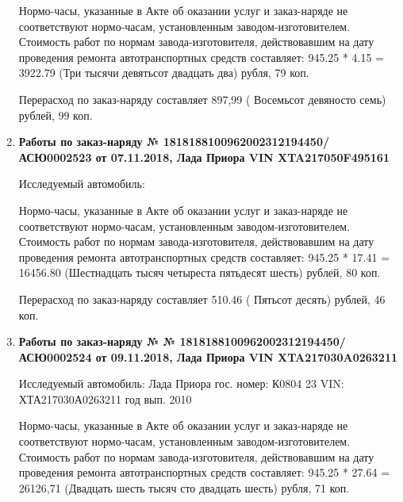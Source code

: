 \begin{enumerate}
Нормо-часы, указанные в Акте об оказании услуг и заказ-наряде не соответствуют нормо-часам,  установленным заводом-изготовителем.\\
Стоимость работ по нормам завода-изготовителя, действовавшим на дату проведения ремонта автотранспортных средств составляет: 945.25 * 4.15 = 3922.79 (Три тысячи девятьсот двадцать два) рубля, 79 коп.

Перерасход по заказ-наряду составляет 897,99 ( Восемьсот девяносто семь) рублей, 99 коп.  
\vspace{3mm}






\item \par\textbf{{Работы по заказ-наряду № 1818188100962002312194450/\-АСЮ0002523 от 07.11.2018, Лада Приора  VIN  XTA217050F495161
}}


Исследуемый автомобиль:  




Нормо-часы, указанные в Акте об оказании услуг и заказ-наряде не соответствуют нормо-часам,  установленным заводом-изготовителем.\\
Стоимость работ по нормам завода-изготовителя, действовавшим на дату проведения ремонта автотранспортных средств составляет: 945.25 * 17.41 = 16456.80 (Шестнадцать тысяч четыреста пятьдесят шесть) рублей, 80 коп.

Перерасход по заказ-наряду составляет 510.46 ( Пятьсот десять) рублей, 46 коп.  
\vspace{3mm}






\item \par\textbf{{Работы по заказ-наряду № № 1818188100962002312194450/\-АСЮ0002524 от 09.11.2018, Лада Приора VIN  XTA217030A0263211
}}


Исследуемый автомобиль:  Лада Приора гос. номер: К0804 23 VIN: ХТА217030А0263211 год вып. 2010





Нормо-часы, указанные в Акте об оказании услуг и заказ-наряде не соответствуют нормо-часам,  установленным заводом-изготовителем.\\
Стоимость работ по нормам завода-изготовителя, действовавшим на дату проведения ремонта автотранспортных средств составляет: 945.25 * 27.64 = 26126,71 (Двадцать шесть тысяч сто двадцать шесть) рубля, 71 коп.


\end{enumerate}
